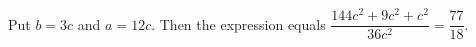Put $b=3c$ and $a=12c$. Then the expression equals $\dfrac{144c^2+9c^2+c^2}{36c^2}=\boxed{\dfrac{77}{18}}$.
